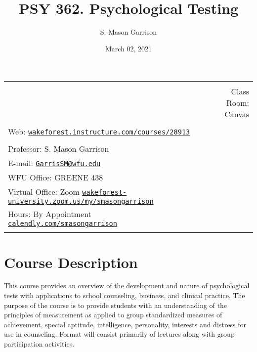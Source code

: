 \documentclass[11pt,]{article}
\title{PSY 362. Psychological Testing}
\author{S. Mason Garrison}
\date{March 02, 2021}
\begin{document}
		\maketitle


		\thispagestyle{firststyle}



\noindent \begin{tabular*}{\textwidth}{ @{\extracolsep{\fill}} lr @{\extracolsep{\fill}}}
\hline\\
    &  Class Room: Canvas
%
\\\hline\\
%
 Web: \href{https://wakeforest.instructure.com/courses/28913}{\tt wakeforest.instructure.com/courses/28913}&  \\ %
&  \\
Professor: S. Mason Garrison \\

E-mail: \texttt{\href{mailto:GarrisSM@wfu.edu}{\nolinkurl{GarrisSM@wfu.edu}}}  \\

WFU Office: GREENE 438   \\
Virtual Office: Zoom
\href{https://wakeforest-university.zoom.us/my/smasongarrison}{\tiny\tt wakeforest-university.zoom.us/my/smasongarrison}   \\
Hours: By Appointment
\href{https://calendly.com/smasongarrison/}{\small\tt calendly.com/smasongarrison}  \\


	&  \\
	\hline
\end{tabular*}

\vspace{2mm}

\hypertarget{course-description}{%
\section{Course Description}\label{course-description}}

This course provides an overview of the development and nature of
psychological tests with applications to school counseling, business,
and clinical practice. The purpose of the course is to provide students
with an understanding of the principles of measurement as applied to
group standardized measures of achievement, special aptitude,
intelligence, personality, interests and distress for use in counseling.
Format will consist primarily of lectures along with group participation
activities.
\end{document}
